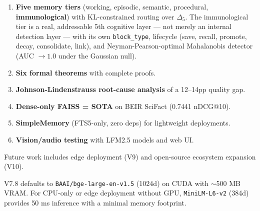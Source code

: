 \documentclass[12pt,a4paper]{article}
\theoremstyle{definition}
\theoremstyle{remark}
\begin{document}
\begin{enumerate}
    \item \textbf{Five memory tiers} (working, episodic, semantic, procedural, \textbf{immunological}) with KL-constrained routing over $\Delta_5$. The immunological tier is a real, addressable 5th cognitive layer --- not merely an internal detection layer --- with its own \texttt{block\_type}, lifecycle (save, recall, promote, decay, consolidate, link), and Neyman-Pearson-optimal Mahalanobis detector (AUC $\to 1.0$ under the Gaussian null).
    \item \textbf{Six formal theorems} with complete proofs.
    \item \textbf{Johnson-Lindenstrauss root-cause analysis} of a 12--14pp quality gap.
    \item \textbf{Dense-only FAISS = SOTA} on BEIR SciFact (0.7441 nDCG@10).
    \item \textbf{SimpleMemory} (FTS5-only, zero deps) for lightweight deployments.
    \item \textbf{Vision/audio testing} with LFM2.5 models and web UI.
\end{enumerate}

Future work includes edge deployment (V9) and open-source ecosystem expansion (V10).

V7.8 defaults to \texttt{BAAI/bge-large-en-v1.5} (1024d) on CUDA with $\sim$500 MB VRAM. For CPU-only or edge deployment without GPU, \texttt{MiniLM-L6-v2} (384d) provides 50 ms inference with a minimal memory footprint.
\end{document}
